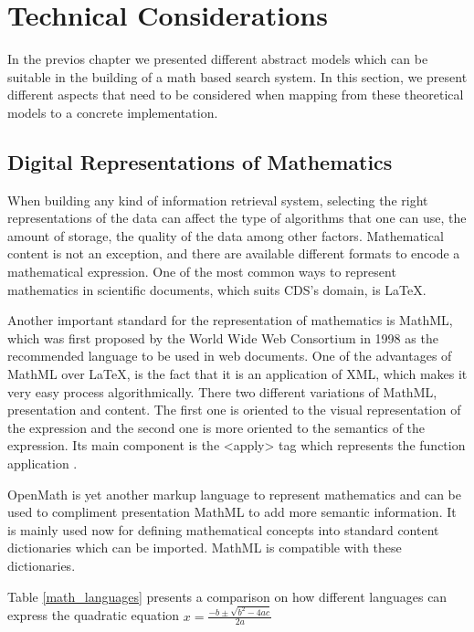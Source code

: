 \chapter{Technical Considerations}
\label{chapter-technical_considerations}
In the previos chapter we presented different abstract models which can be suitable in the building of a math based search system.
In this section, we present different aspects that need to be considered when mapping from these theoretical models to a concrete implementation.

\section{Digital Representations of Mathematics}
When building any kind of information retrieval system, selecting the right representations of the data can affect the type of algorithms that one can use, the amount of storage, the quality of the data among other factors. Mathematical content is not an exception, and there are available different formats to encode a mathematical expression. One of the most common ways to represent mathematics in scientific documents, which suits CDS's domain, is \LaTeX. 

Another  important standard for the representation of mathematics is MathML, which was first proposed by the World Wide Web Consortium in 1998 as the recommended language to be used in web documents. One of the advantages of MathML over LaTeX, is the fact that it is an application of XML, which makes it very easy process algorithmically. There two different variations of MathML, presentation and content. The first one is oriented to the visual representation of the expression and the second one is more oriented to the semantics of the expression. Its main component is the <apply> tag which represents the function application . 

OpenMath is yet another markup language to represent mathematics and can be used to compliment presentation MathML to add more semantic information. It is mainly used now for defining mathematical concepts into standard content dictionaries which can be imported. MathML is compatible with these dictionaries.

Table \ref{math_languages} presents a comparison on how different languages can express the quadratic equation $x = \frac{-b \pm \sqrt{b^2 - 4ac}}{2a} $


